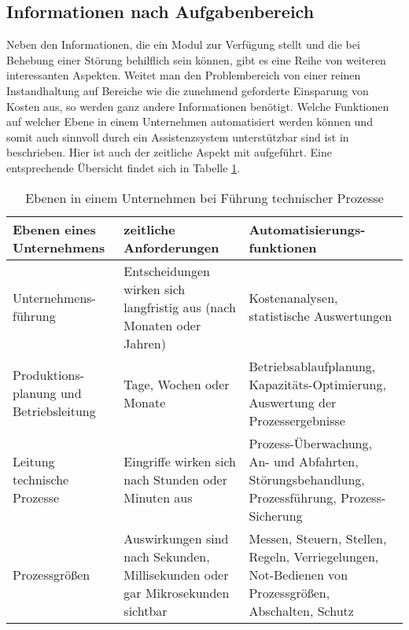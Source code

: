 \subsection{Informationen nach Aufgabenbereich}
Neben den Informationen, die ein Modul zur Verfügung stellt und die bei Behebung einer Störung behilflich sein können, gibt es eine Reihe von weiteren interessanten Aspekten. Weitet man den Problembereich von einer reinen Instandhaltung auf Bereiche wie die zunehmend geforderte Einsparung von Kosten aus, so werden ganz andere Informationen benötigt. Welche Funktionen auf welcher Ebene in einem Unternehmen automatisiert werden können und somit auch sinnvoll durch ein Assistenzsystem unterstützbar sind ist in \cite{Lauber1999} beschrieben. Hier ist auch der zeitliche Aspekt mit aufgeführt. Eine entsprechende Übersicht findet sich in Tabelle \ref{tab:Ebenen-Unternehmen}.
\begin{table}[htb]
\centering
\caption{Ebenen in einem Unternehmen bei Führung technischer Prozesse}
\label{tab:Ebenen-Unternehmen}
\begin{tabular}{|p{}|p{}|p{}|}
\hline
\textbf{Ebenen eines Unternehmens} & \textbf{zeitliche Anforderungen} & \textbf{Automatisierungs-funktionen} \\
\hline
Unternehmens-führung & Entscheidungen wirken sich langfristig aus (nach Monaten oder Jahren) & Kostenanalysen, statistische Auswertungen \\
\hline
Produktions-planung und Betriebsleitung & Tage, Wochen oder Monate & Betriebsablaufplanung, Kapazitäts-Optimierung, Auswertung der Prozessergebnisse \\
\hline
Leitung technische Prozesse & Eingriffe wirken sich nach Stunden oder Minuten aus & Prozess-Überwachung, An- und Abfahrten, Störungsbehandlung, Prozessführung, Prozess-Sicherung \\
\hline
Prozessgrößen & Auswirkungen sind nach Sekunden, Millisekunden oder gar Mikrosekunden sichtbar & Messen, Steuern, Stellen, Regeln, Verriegelungen, Not-Bedienen von Prozessgrößen, Abschalten, Schutz \\
\hline
\end{tabular}
\end{table}

